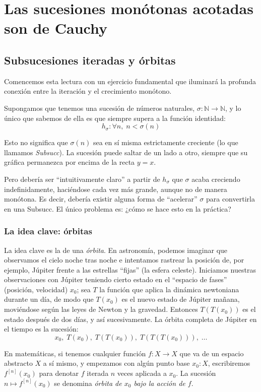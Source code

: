 \chapter{Las sucesiones monótonas acotadas son de Cauchy}

\section{Subsucesiones iteradas y órbitas}

Comencemos esta lectura con un ejercicio fundamental que iluminará la
profunda conexión entre la iteración y el crecimiento monótono.

Supongamos que tenemos una sucesión de números naturales,
$\sigma : \mathbb{N} \to \mathbb{N}$, y lo único que sabemos de ella es
que siempre supera a la función identidad:
\[
  h_\sigma : \forall n,\; n < \sigma(n)
\]

Esto no significa que $\sigma(n)$ sea en sí misma estrictamente creciente
(lo que llamamos \emph{Subsucc}). La sucesión puede saltar de un lado a
otro, siempre que su gráfica permanezca por encima de la recta $y = x$.

Pero debería ser ``intuitivamente claro'' a partir de $h_\sigma$ que
$\sigma$ acaba creciendo indefinidamente, haciéndose cada vez más grande,
aunque no de manera monótona. Es decir, debería existir alguna forma de
``acelerar'' $\sigma$ para convertirla en una Subsucc. El único problema
es: ¿cómo se hace esto en la práctica?

\subsection{La idea clave: órbitas}

La idea clave es la de una \emph{órbita}. En astronomía, podemos imaginar
que observamos el cielo noche tras noche e intentamos rastrear la posición
de, por ejemplo, Júpiter frente a las estrellas ``fijas'' (la esfera
celeste). Iniciamos nuestras observaciones con Júpiter teniendo cierto
estado en el ``espacio de fases'' (posición, velocidad) $x_0$; sea $T$ la
función que aplica la dinámica newtoniana durante un día, de modo que
$T(x_0)$ es el nuevo estado de Júpiter mañana, moviéndose según las leyes
de Newton y la gravedad. Entonces $T(T(x_0))$ es el estado después de dos
días, y así sucesivamente. La órbita completa de Júpiter en el tiempo es
la sucesión:
\[
  x_0,\; T(x_0),\; T(T(x_0)),\; T(T(T(x_0))),\; \ldots
\]

En matemáticas, si tenemos cualquier función $f : X \to X$ que va de un
espacio abstracto $X$ a sí mismo, y empezamos con algún punto base
$x_0 : X$, escribiremos $f^{[n]}(x_0)$ para denotar $f$ iterada $n$ veces
aplicada a $x_0$. La sucesión $n \mapsto f^{[n]}(x_0)$ se denomina
\emph{órbita de $x_0$ bajo la acción de $f$}.

